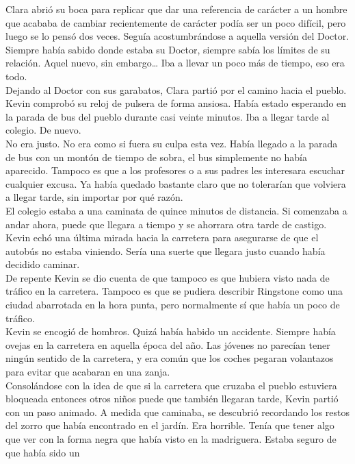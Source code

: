 {Clara abrió su boca para replicar que dar una referencia de carácter a
un hombre que acababa de cambiar recientemente de carácter podía ser un
poco difícil, pero luego se lo pensó dos veces. Seguía acostumbrándose a
aquella versión del Doctor. Siempre había sabido donde estaba su Doctor,
siempre sabía los límites de su relación. Aquel nuevo, sin
embargo\ldots{} Iba a llevar un poco más de tiempo, eso era todo.\\
Dejando al Doctor con sus garabatos, Clara partió por el camino hacia el
pueblo.\\[2\baselineskip]Kevin comprobó su reloj de pulsera de forma
ansiosa. Había estado esperando en la parada de bus del pueblo durante
casi veinte minutos. Iba a llegar tarde al colegio. De nuevo. ~\\
No era justo. No era como si fuera su culpa esta vez. Había llegado a la
parada de bus con un montón de tiempo de sobra, el bus simplemente no
había aparecido. Tampoco es que a los profesores o a sus padres les
interesara escuchar cualquier excusa. Ya había quedado bastante claro
que no tolerarían que volviera a llegar tarde, sin importar por qué
razón.\\
El colegio estaba a una caminata de quince minutos de distancia. Si
comenzaba a andar ahora, puede que llegara a tiempo y se ahorrara otra
tarde de castigo.\\
Kevin echó una última mirada hacia la carretera para asegurarse de que
el autobús no estaba viniendo. Sería una suerte que llegara justo cuando
había decidido caminar.\\
De repente Kevin se dio cuenta de que tampoco es que hubiera visto nada
de tráfico en la carretera. Tampoco es que se pudiera describir
Ringstone como una ciudad abarrotada en la hora punta, pero normalmente
sí que había un poco de tráfico.\\
Kevin se encogió de hombros. Quizá había habido un accidente. Siempre
había ovejas en la carretera en aquella época del año. Las jóvenes no
parecían tener ningún sentido de la carretera, y era común que los
coches pegaran volantazos para evitar que acabaran en una zanja.\\
Consolándose con la idea de que si la carretera que cruzaba el pueblo
estuviera bloqueada entonces otros niños puede que también llegaran
tarde, Kevin partió con un paso animado. A medida que caminaba, se
descubrió recordando los restos del zorro que había encontrado en el
jardín. Era horrible. Tenía que tener algo que ver con la forma negra
que había visto en la madriguera. Estaba seguro de que había sido un
}

